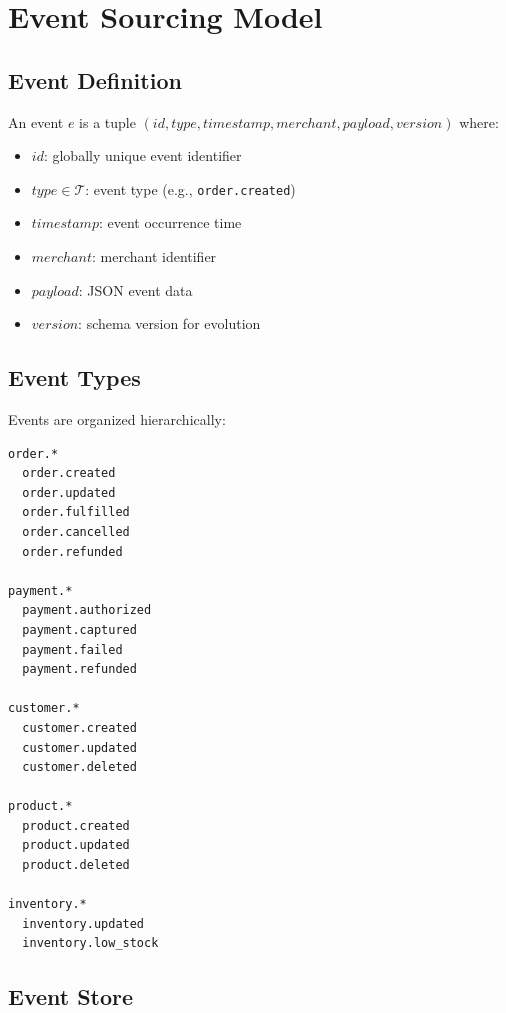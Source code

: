 \section{Event Sourcing Model}


\subsection{Event Definition}

\begin{definition}
An event $e$ is a tuple $(id, type, timestamp, merchant, payload, version)$ where:
\begin{itemize}
    \item $id$: globally unique event identifier
    \item $type \in \mathcal{T}$: event type (e.g., \texttt{order.created})
    \item $timestamp$: event occurrence time
    \item $merchant$: merchant identifier
    \item $payload$: JSON event data
    \item $version$: schema version for evolution
\end{itemize}
\end{definition}

\subsection{Event Types}

Events are organized hierarchically:

\begin{lstlisting}[caption=Event Type Hierarchy]
order.*
  order.created
  order.updated
  order.fulfilled
  order.cancelled
  order.refunded

payment.*
  payment.authorized
  payment.captured
  payment.failed
  payment.refunded

customer.*
  customer.created
  customer.updated
  customer.deleted

product.*
  product.created
  product.updated
  product.deleted

inventory.*
  inventory.updated
  inventory.low_stock
\end{lstlisting}

\subsection{Event Store}


